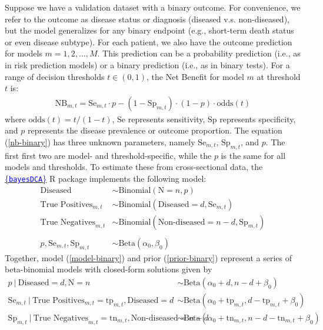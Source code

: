 \documentclass{article}
\def\bayesDCA{\href{https://giulianonetto.github.io/bayesdca/}{\textcolor{blue}{\{\texttt{bayesDCA}\}}} }
\begin{document}
Suppose we have a validation dataset with a binary outcome. For convenience, we refer to the outcome as disease status or diagnosis (diseased v.s. non-diseased), 
but the model generalizes for any binary endpoint (e.g., short-term death status or even disease subtype). For each patient, we also have 
the outcome prediction for models $m = 1,2,\dots, M$. This prediction can be a probability prediction (i.e., as in risk prediction models) or 
a binary prediction (i.e., as in binary tests). For a range of decision thresholds $t \in (0, 1)$, the Net Benefit for model $m$ at threshold $t$
is:
\begin{align}
    \textrm{NB}_{m, t} = \textrm{Se}_{m, t}\cdot p - (1 - \textrm{Sp}_{m, t})\cdot(1-p)\cdot \textrm{odds}(t) \label{nb-binary}
\end{align}
where $\textrm{odds}(t) = t/(1-t)$, $\textrm{Se}$ represents sensitivity, $\textrm{Sp}$ represents specificity, and $p$ represents the disease
prevalence or outcome proportion. The equation (\ref*{nb-binary})
has three unknown parameters, namely $\textrm{Se}_{m, t}$, $\textrm{Sp}_{m, t}$, and $p$. The first first two are model- and threshold-specific, while 
the $p$ is the same for all models and thresholds. To estimate these from cross-sectional data, the \bayesDCA R package implements the following model:
\begin{align}
    \textrm{Diseased} &\sim \textrm{Binomial}(\textrm{N} = n, p) \nonumber\\
    \textrm{True Positives}_{m, t} &\sim \textrm{Binomial}(\textrm{Diseased} = d, \textrm{Se}_{m, t}) \label{model-binary}\\
    \textrm{True Negatives}_{m, t} &\sim  \textrm{Binomial}(\textrm{Non-diseased} = n-d, \textrm{Sp}_{m, t}) \nonumber \\
    \nonumber\\
    p, \textrm{Se}_{m, t}, \textrm{Sp}_{m, t} &\sim \textrm{Beta}(\alpha_0, \beta_0) \label{prior-binary}
\end{align}
Together, model (\ref*{model-binary}) and prior (\ref*{prior-binary}) represent a series of beta-binomial models with closed-form solutions given by
\begin{align}
    p \ | \ \textrm{Diseased} = d, \textrm{N} = n &\sim \textrm{Beta}(\alpha_0 + d, n - d + \beta_0) \nonumber\\[5pt] 
    \textrm{Se}_{m, t} \ | \ \textrm{True Positives}_{m, t} = \textrm{tp}_{m, t}, \textrm{Diseased} = d  &\sim \textrm{Beta}(\alpha_0 + \textrm{tp}_{m, t}, d - \textrm{tp}_{m, t} + \beta_0) \label{post-binary}\\[5pt]
    \textrm{Sp}_{m, t} \ | \ \textrm{True Negatives}_{m, t} = \textrm{tn}_{m, t}, \textrm{Non-diseased} = n - d  &\sim \textrm{Beta}(\alpha_0 + \textrm{tn}_{m, t}, n - d - \textrm{tn}_{m, t} + \beta_0)\nonumber 
\end{align}
\end{document}
